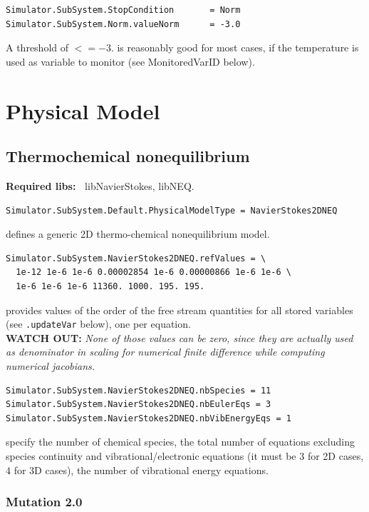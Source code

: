 \documentclass[11pt]{article}
\begin{document}
\begin{verbatim}
Simulator.SubSystem.StopCondition       = Norm
Simulator.SubSystem.Norm.valueNorm      = -3.0
\end{verbatim}
A threshold of $<= -3.$ is reasonably good for most cases, if the temperature is used as variable to monitor (see MonitoredVarID below).

\section{Physical Model}

\subsection{Thermochemical nonequilibrium}

{\bf Required libs:~} libNavierStokes, libNEQ.

\begin{verbatim}
Simulator.SubSystem.Default.PhysicalModelType = NavierStokes2DNEQ
\end{verbatim}
defines a generic 2D thermo-chemical nonequilibrium model.

\begin{verbatim}
Simulator.SubSystem.NavierStokes2DNEQ.refValues = \
  1e-12 1e-6 1e-6 0.00002854 1e-6 0.00000866 1e-6 1e-6 \
  1e-6 1e-6 1e-6 11360. 1000. 195. 195.
\end{verbatim}
provides values of the order of the free stream quantities for all stored variables (see {\tt .updateVar} below), one per equation. \\
{\bf WATCH OUT:} {\it None of those values can be zero, since they are actually used 
  as denominator in scaling for numerical finite difference while computing numerical jacobians. } 

\begin{verbatim}
Simulator.SubSystem.NavierStokes2DNEQ.nbSpecies = 11
Simulator.SubSystem.NavierStokes2DNEQ.nbEulerEqs = 3
Simulator.SubSystem.NavierStokes2DNEQ.nbVibEnergyEqs = 1
\end{verbatim}
specify the number of chemical species, the total number of equations excluding species continuity and vibrational/electronic equations 
(it must be $3$ for 2D cases, $4$ for 3D cases), the number of vibrational energy equations.

\subsubsection{Mutation 2.0}
\end{document}
